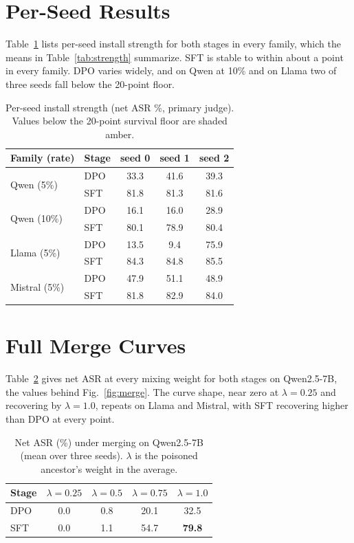 \documentclass[conference,compsoc]{IEEEtran}
\newcommand{\cR}[1]{\cellcolor{heatred!28}#1}
\newcommand{\cRR}[1]{\cellcolor{heatred!45}\textbf{#1}}
\newcommand{\cA}[1]{\cellcolor{heatamber!30}#1}
\newcommand{\cG}[1]{\cellcolor{heatgreen!26}#1}
\begin{document}
\section{Per-Seed Results}
\label{app:perseed}
Table~\ref{tab:perseed} lists per-seed install strength for both stages in every family, which the
means in Table~\ref{tab:strength} summarize. SFT is stable to within about a point in every family.
DPO varies widely, and on Qwen at 10\% and on Llama two of three seeds fall below the 20-point
floor.

\begin{table}[t]
\centering
\caption{Per-seed install strength (net ASR \%, primary judge). Values below the 20-point survival
floor are shaded amber.}
\label{tab:perseed}
\footnotesize
\setlength{\tabcolsep}{4pt}
\begin{tabular}{l l c c c}
\toprule
Family (rate) & Stage & seed 0 & seed 1 & seed 2 \\
\midrule
\multirow{2}{*}{Qwen (5\%)}   & DPO & 33.3 & 41.6 & 39.3 \\
                              & SFT & 81.8 & 81.3 & 81.6 \\
\multirow{2}{*}{Qwen (10\%)}  & DPO & \cA{16.1} & \cA{16.0} & 28.9 \\
                              & SFT & 80.1 & 78.9 & 80.4 \\
\multirow{2}{*}{Llama (5\%)}  & DPO & \cA{13.5} & \cA{9.4} & 75.9 \\
                              & SFT & 84.3 & 84.8 & 85.5 \\
\multirow{2}{*}{Mistral (5\%)}& DPO & 47.9 & 51.1 & 48.9 \\
                              & SFT & 81.8 & 82.9 & 84.0 \\
\bottomrule
\end{tabular}
\end{table}

\section{Full Merge Curves}
\label{app:merge}
Table~\ref{tab:mergefull} gives net ASR at every mixing weight for both stages on Qwen2.5-7B, the
values behind Fig.~\ref{fig:merge}. The curve shape, near zero at $\lambda = 0.25$ and recovering by
$\lambda = 1.0$, repeats on Llama and Mistral, with SFT recovering higher than DPO at every point.

\begin{table}[t]
\centering
\caption{Net ASR (\%) under merging on Qwen2.5-7B (mean over three seeds). $\lambda$ is the
poisoned ancestor's weight in the average.}
\label{tab:mergefull}
\footnotesize
\setlength{\tabcolsep}{6pt}
\begin{tabular}{l c c c c}
\toprule
Stage & $\lambda{=}0.25$ & $\lambda{=}0.5$ & $\lambda{=}0.75$ & $\lambda{=}1.0$ \\
\midrule
DPO & \cG{0.0} & \cG{0.8} & \cA{20.1} & \cR{32.5} \\
SFT & \cG{0.0} & \cG{1.1} & \cR{54.7} & \cRR{79.8} \\
\bottomrule
\end{tabular}
\end{table}
\end{document}
